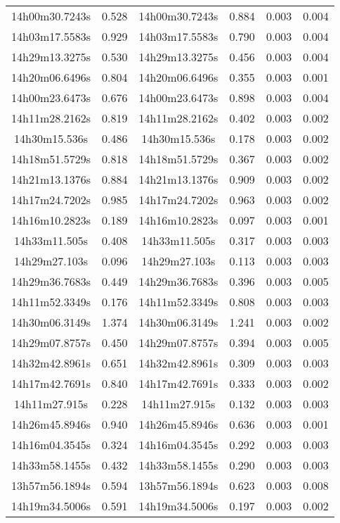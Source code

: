 \begin{table}
\begin{tabular}{cccccc}
14h00m30.7243s & 0.528 & 14h00m30.7243s & 0.884 & 0.003 & 0.004 \\
14h03m17.5583s & 0.929 & 14h03m17.5583s & 0.790 & 0.003 & 0.004 \\
14h29m13.3275s & 0.530 & 14h29m13.3275s & 0.456 & 0.003 & 0.004 \\
14h20m06.6496s & 0.804 & 14h20m06.6496s & 0.355 & 0.003 & 0.001 \\
14h00m23.6473s & 0.676 & 14h00m23.6473s & 0.898 & 0.003 & 0.004 \\
14h11m28.2162s & 0.819 & 14h11m28.2162s & 0.402 & 0.003 & 0.002 \\
14h30m15.536s & 0.486 & 14h30m15.536s & 0.178 & 0.003 & 0.002 \\
14h18m51.5729s & 0.818 & 14h18m51.5729s & 0.367 & 0.003 & 0.002 \\
14h21m13.1376s & 0.884 & 14h21m13.1376s & 0.909 & 0.003 & 0.002 \\
14h17m24.7202s & 0.985 & 14h17m24.7202s & 0.963 & 0.003 & 0.002 \\
14h16m10.2823s & 0.189 & 14h16m10.2823s & 0.097 & 0.003 & 0.001 \\
14h33m11.505s & 0.408 & 14h33m11.505s & 0.317 & 0.003 & 0.003 \\
14h29m27.103s & 0.096 & 14h29m27.103s & 0.113 & 0.003 & 0.003 \\
14h29m36.7683s & 0.449 & 14h29m36.7683s & 0.396 & 0.003 & 0.005 \\
14h11m52.3349s & 0.176 & 14h11m52.3349s & 0.808 & 0.003 & 0.003 \\
14h30m06.3149s & 1.374 & 14h30m06.3149s & 1.241 & 0.003 & 0.002 \\
14h29m07.8757s & 0.450 & 14h29m07.8757s & 0.394 & 0.003 & 0.005 \\
14h32m42.8961s & 0.651 & 14h32m42.8961s & 0.309 & 0.003 & 0.003 \\
14h17m42.7691s & 0.840 & 14h17m42.7691s & 0.333 & 0.003 & 0.002 \\
14h11m27.915s & 0.228 & 14h11m27.915s & 0.132 & 0.003 & 0.003 \\
14h26m45.8946s & 0.940 & 14h26m45.8946s & 0.636 & 0.003 & 0.001 \\
14h16m04.3545s & 0.324 & 14h16m04.3545s & 0.292 & 0.003 & 0.003 \\
14h33m58.1455s & 0.432 & 14h33m58.1455s & 0.290 & 0.003 & 0.003 \\
13h57m56.1894s & 0.594 & 13h57m56.1894s & 0.623 & 0.003 & 0.008 \\
14h19m34.5006s & 0.591 & 14h19m34.5006s & 0.197 & 0.003 & 0.002 \\

\end{tabular}
\end{table}
